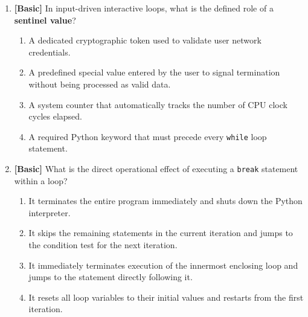 \documentclass[11pt,a4paper]{article}
\begin{document}
\begin{enumerate}[label=\textbf{Q\arabic*.},leftmargin=1.8em,itemsep=0.6pt,topsep=0.2pt]
\item \textbf{[Basic]} In input-driven interactive loops, what is the defined role of a \textbf{sentinel value}?
\begin{enumerate}[label=\Alph*.,leftmargin=1.8em]
  \item A dedicated cryptographic token used to validate user network credentials.
  \item A predefined special value entered by the user to signal termination without being processed as valid data.
  \item A system counter that automatically tracks the number of CPU clock cycles elapsed.
  \item A required Python keyword that must precede every \texttt{while} loop statement.
\end{enumerate}

\item \textbf{[Basic]} What is the direct operational effect of executing a \texttt{break} statement within a loop?
\begin{enumerate}[label=\Alph*.,leftmargin=1.8em]
  \item It terminates the entire program immediately and shuts down the Python interpreter.
  \item It skips the remaining statements in the current iteration and jumps to the condition test for the next iteration.
  \item It immediately terminates execution of the innermost enclosing loop and jumps to the statement directly following it.
  \item It resets all loop variables to their initial values and restarts from the first iteration.
\end{enumerate}

\end{enumerate}

\newpage

\end{document}
